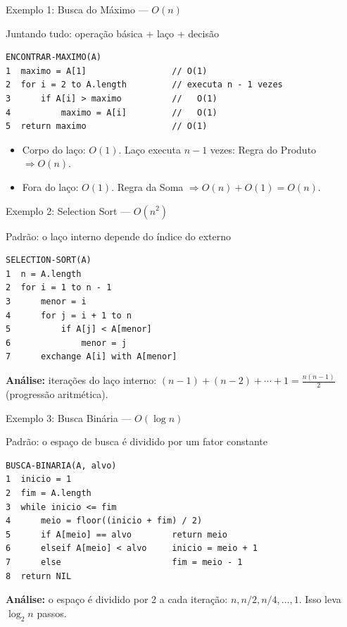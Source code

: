 \documentclass[aspectratio=169]{beamer}
\begin{document}
\begin{frame}[fragile]{Exemplo 1: Busca do Máximo --- $O(n)$}
  \begin{block}{Juntando tudo: operação básica + laço + decisão}
  \end{block}
\begin{verbatim}
ENCONTRAR-MAXIMO(A)
1  maximo = A[1]                 // O(1)
2  for i = 2 to A.length         // executa n - 1 vezes
3      if A[i] > maximo          //   O(1)
4          maximo = A[i]         //   O(1)
5  return maximo                 // O(1)
\end{verbatim}
  \begin{itemize}
    \item Corpo do laço: $O(1)$. Laço executa $n-1$ vezes: Regra do Produto $\Rightarrow O(n)$.
    \item Fora do laço: $O(1)$. Regra da Soma $\Rightarrow O(n) + O(1) = O(n)$.
  \end{itemize}
  \hfill{}
\end{frame}

\begin{frame}{Exemplo 2: Selection Sort --- $O(n^2)$}
  \begin{block}{Padrão: o laço interno depende do índice do externo}
  \end{block}
\begin{verbatim}
SELECTION-SORT(A)
1  n = A.length
2  for i = 1 to n - 1
3      menor = i
4      for j = i + 1 to n
5          if A[j] < A[menor]
6              menor = j
7      exchange A[i] with A[menor]
\end{verbatim}
  \textbf{Análise:} iterações do laço interno:
  $(n{-}1) + (n{-}2) + \cdots + 1 = \frac{n(n-1)}{2}$ (progressão aritmética).

  \vspace{0.2cm}
  \hfill{}
\end{frame}

\begin{frame}{Exemplo 3: Busca Binária --- $O(\log n)$}
  \begin{block}{Padrão: o espaço de busca é dividido por um fator constante}
  \end{block}
\begin{verbatim}
BUSCA-BINARIA(A, alvo)
1  inicio = 1
2  fim = A.length
3  while inicio <= fim
4      meio = floor((inicio + fim) / 2)
5      if A[meio] == alvo        return meio
6      elseif A[meio] < alvo     inicio = meio + 1
7      else                      fim = meio - 1
8  return NIL
\end{verbatim}
  \textbf{Análise:} o espaço é dividido por 2 a cada iteração:
  $n, n/2, n/4, \ldots, 1$. Isso leva $\log_2 n$ passos.

  \vspace{0.1cm}
  \hfill{}
\end{frame}
\end{document}

